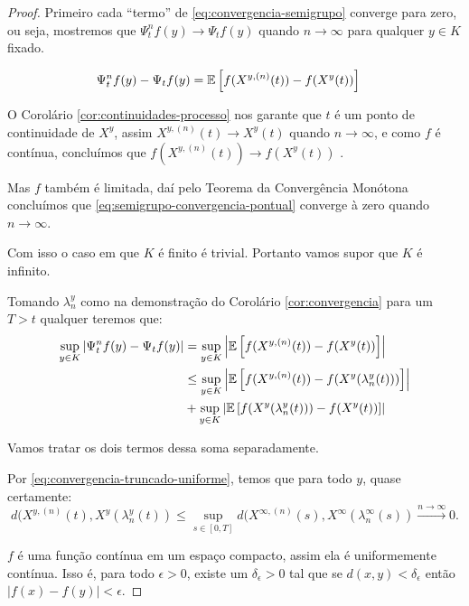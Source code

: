 \begin{proof}

  Primeiro cada ``termo'' de \eqref{eq:convergencia-semigrupo}
  converge para zero, ou seja, mostremos que $\Psi^n_t f (y) \to
  \Psi_t f(y)$ quando $n \to \infty$ para qualquer $y \in K$ fixado.

  \begin{align}
    \label{eq:semigrupo-convergencia-pontual}
    \Psi^n_t f (y) -\Psi_t f(y) &=
    {\mathbb{E}} \left[
      f(X^{y, (n)}(t)) - f(X^y(t))
    \right]
  \end{align}

  O Corolário \ref{cor:continuidades-processo} nos garante que $t$ é
  \qc um ponto de continuidade de $X^y$, assim $X^{y, (n)}(t) \to
  X^y(t)$ \qc quando $n \to \infty$, e como $f$ é contínua, concluímos
  que $f(X^{y, (n)}(t)) \to f(X^y(t))$ \qc.

  Mas $f$ também é limitada, daí pelo Teorema da Convergência Monótona
  concluímos que \eqref{eq:semigrupo-convergencia-pontual} converge à
  zero quando $n \to \infty$.

  Com isso o caso em que $K$ é finito é trivial. Portanto vamos supor
  que $K$ é infinito.

  Tomando $\lambda_n^y$ como na demonstração do Corolário
  \ref{cor:convergencia} para um $T > t$ qualquer teremos que:
  \begin{align}
    \label{eq:esperancas-markov}
    \sup_{y \in K} | \Psi^n_t f (y) - \Psi_t f(y) | 
    &= \sup_{y \in K} \left\lvert {\mathbb{E}} \left[f(X^{y, (n)}(t)) -
        f(X^y(t)) \right]\right\rvert \\
    &\leq \sup_{y\in K}\left\lvert {\mathbb{E}} \left[f(X^{y, (n)}(t)) -
        f(X^y(\lambda_n^y(t))) \right]
    \right\rvert \notag \\
    &+ \sup_{y\in K}\left\lvert {\mathbb{E}} \left[f(X^y(\lambda_n^y(t))) -
        f(X^y(t)) \right] \right\rvert \notag
  \end{align}

  Vamos tratar os dois termos dessa soma separadamente.

  Por \eqref{eq:convergencia-truncado-uniforme}, temos que para todo
  $y$, quase certamente:
  \begin{equation}
    \label{eq:dist-uniforme}
    d(X^{y, (n)}(t), X^y(\lambda_n^y(t)) \leq
    \sup_{s \in [0, T]} d(X^{\infty, (n)}(s), X^\infty(\lambda_n^\infty(s))
    \xrightarrow{n\to\infty} 0.
  \end{equation}
  
  $f$ é uma função contínua em um espaço compacto, assim ela é
  uniformemente contínua. Isso é, para todo $\epsilon > 0$, existe um
  $\delta_\epsilon > 0$ tal que se $d(x, y) < \delta_\epsilon$ então
  $|f(x)-f(y)| < \epsilon$.


\end{proof}
